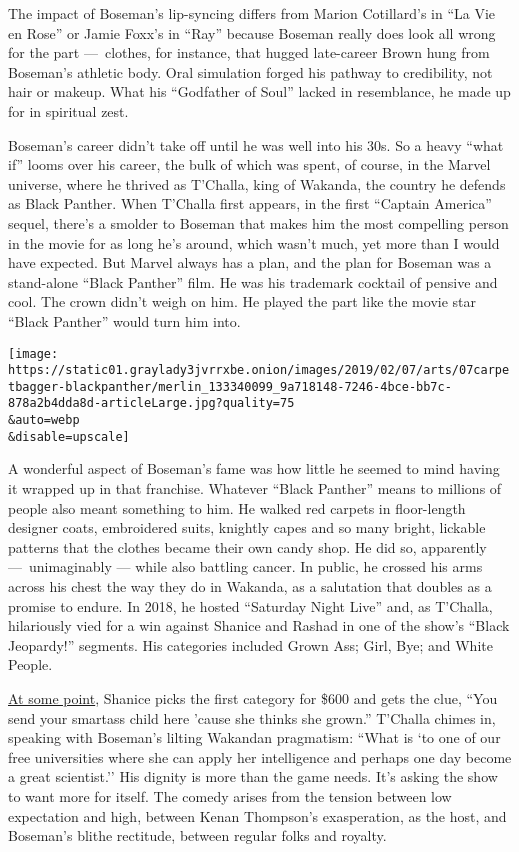 The impact of Boseman's lip-syncing differs from Marion Cotillard's in
``La Vie en Rose'' or Jamie Foxx's in ``Ray'' because Boseman really
does look all wrong for the part ---~clothes, for instance, that hugged
late-career Brown hung from Boseman's athletic body. Oral simulation
forged his pathway to credibility, not hair or makeup. What his
``Godfather of Soul'' lacked in resemblance, he made up for in spiritual
zest.

Boseman's career didn't take off until he was well into his 30s. So a
heavy ``what if'' looms over his career, the bulk of which was spent, of
course, in the Marvel universe, where he thrived as T'Challa, king of
Wakanda, the country he defends as Black Panther. When T'Challa first
appears, in the first ``Captain America'' sequel, there's a smolder to
Boseman that makes him the most compelling person in the movie for as
long he's around, which wasn't much, yet more than I would have
expected. But Marvel always has a plan, and the plan for Boseman was a
stand-alone ``Black Panther'' film. He was his trademark cocktail of
pensive and cool. The crown didn't weigh on him. He played the part like
the movie star ``Black Panther'' would turn him into.

\texttt{[image: https://static01.graylady3jvrrxbe.onion/images/2019/02/07/arts/07carpetbagger-blackpanther/merlin\_133340099\_9a718148-7246-4bce-bb7c-878a2b4dda8d-articleLarge.jpg?quality=75\\\&auto=webp\\\&disable=upscale]}

A wonderful aspect of Boseman's fame was how little he seemed to mind
having it wrapped up in that franchise. Whatever ``Black Panther'' means
to millions of people also meant something to him. He walked red carpets
in floor-length designer coats, embroidered suits, knightly capes and so
many bright, lickable patterns that the clothes became their own candy
shop. He did so, apparently ---~unimaginably --- while also battling
cancer. In public, he crossed his arms across his chest the way they do
in Wakanda, as a salutation that doubles as a promise to endure. In
2018, he hosted ``Saturday Night Live'' and, as T'Challa, hilariously
vied for a win against Shanice and Rashad in one of the show's ``Black
Jeopardy!'' segments. His categories included Grown Ass; Girl, Bye; and
White People.

\href{https://www.youtube.com/watch?v=hzMzFGgmQOc}{At some point},
Shanice picks the first category for \$600 and gets the clue, ``You send
your smartass child here 'cause she thinks she grown.'' T'Challa chimes
in, speaking with Boseman's lilting Wakandan pragmatism: ``What is `to
one of our free universities where she can apply her intelligence and
perhaps one day become a great scientist.'' His dignity is more than the
game needs. It's asking the show to want more for itself. The comedy
arises from the tension between low expectation and high, between Kenan
Thompson's exasperation, as the host, and Boseman's blithe rectitude,
between regular folks and royalty.

